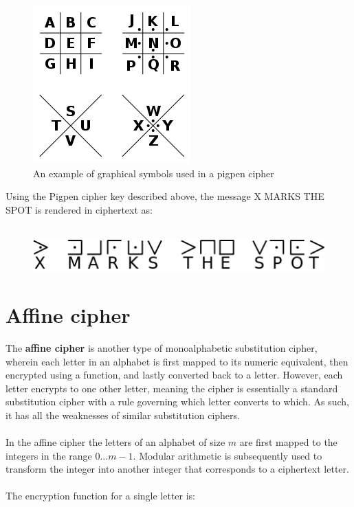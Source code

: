 \documentclass[Lau,binding=0.6cm,oneside]{sapthesis}
\begin{document}
\begin{figure}[h]
\includegraphics[scale=0.4]{pigpen}
\centering
\caption{An example of graphical symbols used in a pigpen cipher}
\centering
\end{figure}

Using the Pigpen cipher key described above, the message \textsf{X MARKS THE SPOT} is rendered in ciphertext as:\\\\

\begin{figure}[h]
\includegraphics[scale=0.7]{xmarksthespot}
\centering
\caption{}
\centering
\end{figure}

\section{Affine cipher}
The \textbf{affine cipher} is another type of monoalphabetic substitution cipher, wherein each letter in an alphabet is first mapped to its numeric equivalent, then encrypted using a function, and lastly converted back to a letter. However, each letter encrypts to one other letter, meaning the cipher is essentially a standard substitution cipher with a rule governing which letter converts to which. As such, it has all the weaknesses of similar substitution ciphers\supercite{affine}.\\\\
In the affine cipher the letters of an alphabet of size $m$ are first mapped to the integers in the range $0 ... m-1$. Modular arithmetic is subsequently used to transform the integer into another integer that corresponds to a ciphertext letter.\\\\ The encryption function for a single letter is:
\end{document}

